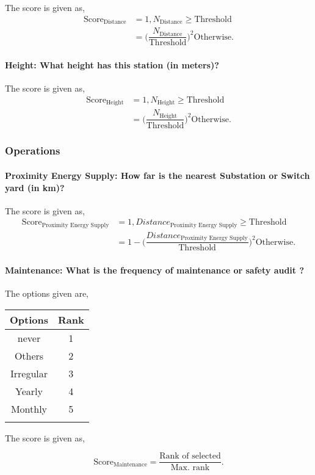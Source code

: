 \documentclass[oneside,twocolumn]{article}
\newcommand{\tsub}[2]{\text{#1}_{\text{#2}}}
\newcommand{\tsubb}[2]{#1_{\text{#2}}}
\newcommand{\dsub}[2]{\dfrac{\text{#1}}{\text{#2}}}
\newcommand{\singsel}[1]
{
	\[
		\tsub{Score}{#1} = \dsub{Rank of selected}{Max. rank}.
	\]
}
\newenvironment{ttable}
{
\begin{center}
\begin{tabular}{c|c}
\hline
}
{
\\ \hline
\end{tabular}
\end{center}
}
\begin{document}
The score is given as,
\begin{align*}
\tsub{Score}{Distance} &= 1, \tsubb{N}{Distance} \ge \text{Threshold} \\
        &=
\Big(\dfrac{\tsubb{N}{Distance}}{\text{Threshold}}\Big)^{2}
\text{Otherwise}.
\end{align*}
\paragraph{Height: What height has this station (in meters)?}

The score is given as,
\begin{align*}
\tsub{Score}{Height} &= 1, \tsubb{N}{Height} \ge \text{Threshold} \\
        &=
\Big(\dfrac{\tsubb{N}{Height}}{\text{Threshold}}\Big)^{2}
\text{Otherwise}.
\end{align*}
\subsubsection{Operations}

\paragraph{Proximity Energy Supply: How far is the nearest Substation or Switch yard (in km)?}

The score is given as,
\begin{align*}
\tsub{Score}{Proximity Energy Supply} &= 1, \tsubb{Distance}{Proximity Energy Supply} \ge \text{Threshold} \\
        &=
1 - \Big(\dfrac{\tsubb{Distance}{Proximity Energy Supply}}{\text{Threshold}}\Big)^{2}
\text{Otherwise}.
\end{align*}
\paragraph{Maintenance: What is the frequency of  maintenance or safety audit ?}

The options given are,
\begin{ttable}
Options & Rank \\ \hline
never & 1 \\
Others & 2 \\
Irregular & 3 \\
Yearly & 4 \\
Monthly & 5 \\
\hline
\end{ttable}
The score is given as,
\singsel{Maintenance}
\end{document}
